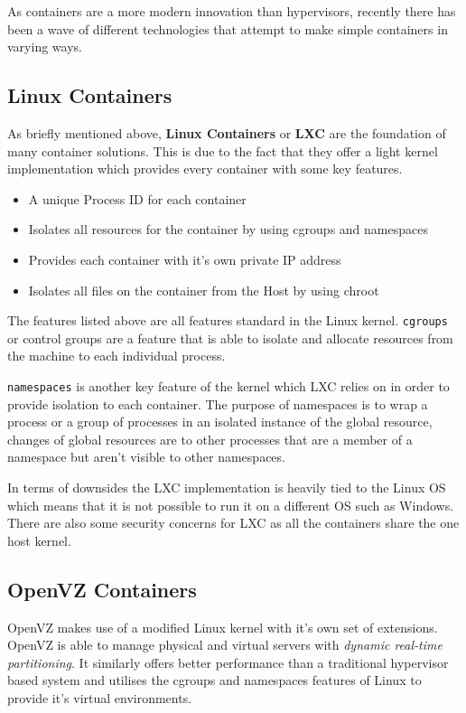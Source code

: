 As containers are a more modern innovation than hypervisors, recently there has been a wave of different technologies that attempt to make simple containers in varying ways.

\subsection{Linux Containers}

As briefly mentioned above, \textbf{Linux Containers} or \textbf{LXC} are the foundation of many container solutions. This is due to the fact that they offer a light kernel implementation which provides every container with some key features.

\begin{itemize}
    \item A unique Process ID for each container
    \item Isolates all resources for the container by using cgroups and namespaces
    \item Provides each container with it's own private IP address
    \item Isolates all files on the container from the Host by using chroot
\end{itemize}

The features listed above are all features standard in the Linux kernel. \texttt{cgroups} \cite{cgroups-man} or control groups are a feature that is able to isolate and allocate resources from the machine to each individual process. 

\texttt{namespaces} \cite{namespaces-man} is another key feature of the kernel which LXC relies on in order to provide isolation to each container. The purpose of namespaces is to wrap a process or a group of processes in an isolated instance of the global resource, changes of global resources are to other processes that are a member of a namespace but aren't visible to other namespaces.

In terms of downsides the LXC implementation is heavily tied to the Linux OS which means that it is not possible to run it on a different OS such as Windows. There are also some security concerns for LXC as all the containers share the one host kernel.

\subsection{OpenVZ Containers}

OpenVZ makes use of a modified Linux kernel with it's own set of extensions. OpenVZ is able to manage physical and virtual servers with \textit{dynamic real-time partitioning}. It similarly offers better performance than a traditional hypervisor based system and utilises the cgroups and namespaces features of Linux to provide it's virtual environments.

